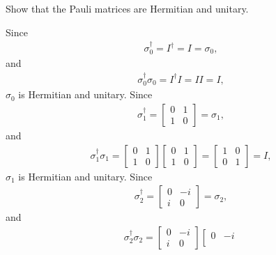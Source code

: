 \documentclass[en]{sol-man}
\begin{document}
\begin{exe}
    Show that the Pauli matrices are Hermitian and unitary.
\end{exe}
\begin{pf}
    Since
    \begin{align}
        \sigma_0^{\dagger}=I^{\dagger}=I=\sigma_0,
    \end{align}
    and
    \begin{align}
        \sigma_0^{\dagger}\sigma_0=I^{\dagger}I=II=I,
    \end{align}
    $\sigma_0$ is Hermitian and unitary.
    Since
    \begin{align}
        \sigma_1^{\dagger}=\left[\begin{matrix}
            0&1\\
            1&0
        \end{matrix}\right]=\sigma_1,
    \end{align}
    and
    \begin{align}
        \sigma_1^{\dagger}\sigma_1=\left[\begin{matrix}
            0&1\\
            1&0
        \end{matrix}\right]\left[\begin{matrix}
            0&1\\
            1&0
        \end{matrix}\right]=\left[\begin{matrix}
            1&0\\
            0&1
        \end{matrix}\right]=I,
    \end{align}
    $\sigma_1$ is Hermitian and unitary.
    Since
    \begin{align}
        \sigma_2^{\dagger}=\left[\begin{matrix}
            0&-i\\
            i&0
        \end{matrix}\right]=\sigma_2,
    \end{align}
    and
    \begin{align}
        \sigma_2^{\dagger}\sigma_2=\left[\begin{matrix}
            0&-i\\
            i&0
        \end{matrix}\right]\left[\begin{matrix}
            0&-i\\

\end{matrix}
\end{align}
\end{pf}
\end{document}
